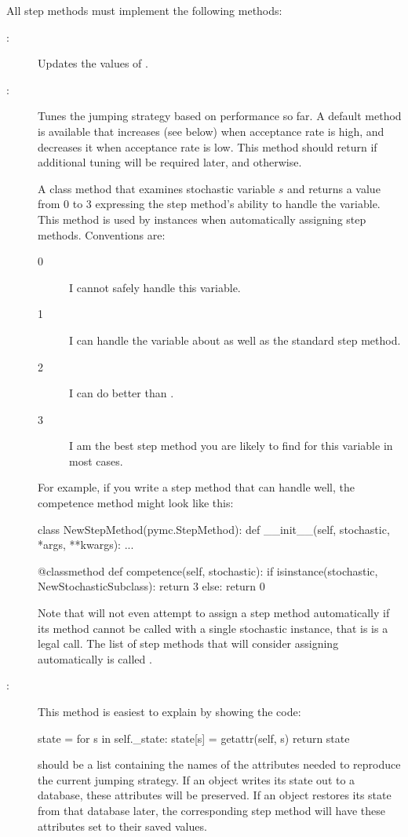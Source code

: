 \documentclass[]{jss}
\begin{document}
All step methods must implement the following methods:
\begin{description}
   \item[:] Updates the values of .
   \item[:] Tunes the jumping strategy based on performance so far. A default method is available that increases  (see below) when acceptance rate is high, and decreases it when acceptance rate is low. This method should return  if additional tuning will be required later, and  otherwise.
   \item[] A class method that examines stochastic variable $s$ and returns a value from 0 to 3 expressing the step method's ability to handle the variable. This method is used by  instances when automatically assigning step methods. Conventions are:
   \begin{description}
      \item[0] I cannot safely handle this variable.
      \item[1] I can handle the variable about as well as the standard  step method.
      \item[2] I can do better than .
      \item[3] I am the best step method you are likely to find for this variable in most cases.
   \end{description}
   For example, if you write a step method that can handle  well, the competence method might look like this:
\begin{CodeInput}
class NewStepMethod(pymc.StepMethod):
    def __init__(self, stochastic, *args, **kwargs):
      ...

    @classmethod
    def competence(self, stochastic):
      if isinstance(stochastic, NewStochasticSubclass):
         return 3
      else:
         return 0
\end{CodeInput}
   Note that  will not even attempt to assign a step method automatically if its  method cannot be called with a single stochastic instance, that is  is a legal call. The list of step methods that  will consider assigning automatically is called .
   \item[:] This method is easiest to explain by showing the code:
   \begin{CodeInput}
state = {}
for s in self._state:
state[s] = getattr(self, s)
return state
\end{CodeInput}
    should be a list containing the names of the attributes needed to reproduce the current jumping strategy. If an  object writes its state out to a database, these attributes will be preserved. If an  object restores its state from that database later, the corresponding step method will have these attributes set to their saved values.
\end{description}
\end{document}
